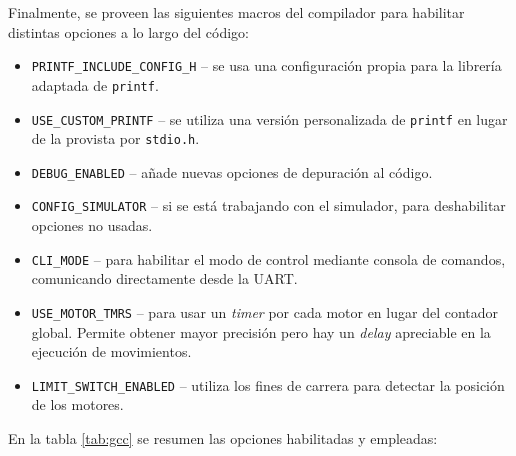 Finalmente, se proveen las siguientes macros del compilador para habilitar distintas
opciones a lo largo del código:

\begin{itemize}
    \item \texttt{PRINTF\_INCLUDE\_CONFIG\_H} -- se usa una configuración propia para
    la librería adaptada de \texttt{printf}.
    \item \texttt{USE\_CUSTOM\_PRINTF} -- se utiliza una versión personalizada de
    \texttt{printf} en lugar de la provista por \lstinline[style=C]{stdio.h}.
    \item \texttt{DEBUG\_ENABLED} -- añade nuevas opciones de depuración al código.
    \item \texttt{CONFIG\_SIMULATOR} -- si se está trabajando con el simulador, para
    deshabilitar opciones no usadas.
    \item \texttt{CLI\_MODE} -- para habilitar el modo de control mediante consola
    de comandos, comunicando directamente desde la \ac{UART}.
    \item \texttt{USE\_MOTOR\_TMRS} -- para usar un \textit{timer} por cada motor en
    lugar del contador global. Permite obtener mayor precisión pero hay un \textit{delay}
    apreciable en la ejecución de movimientos.
    \item \texttt{LIMIT\_SWITCH\_ENABLED} -- utiliza los fines de carrera para 
    detectar la posición de los motores.
\end{itemize}

En la tabla \ref{tab:gcc} se resumen las opciones habilitadas y empleadas:

